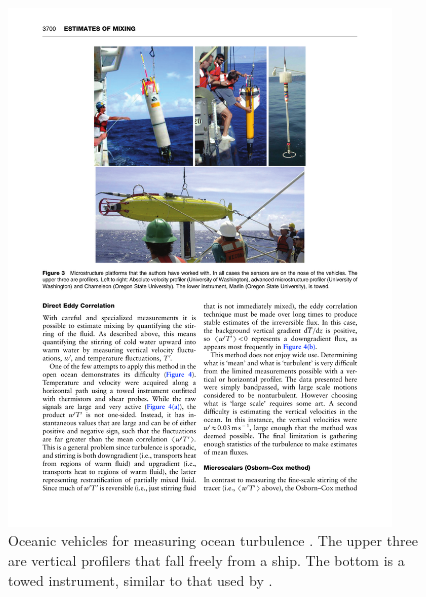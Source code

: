 \documentclass[11pt]{article}
\begin{document}
\begin{figure}[hbtp]
  \begin{center}
    \includegraphics[width=4in]{images/KlymakNash09Fig3}
    \caption{Oceanic vehicles for measuring ocean turbulence \citep{klymaknash09}. The upper three are vertical profilers that fall freely from a ship.  The bottom is a towed instrument, similar to that used by \citet{grantetal62, gargettetal84}.}   
    \label{fig:KlymakNash09Fig3}
  \end{center}
\end{figure}
\end{document}
